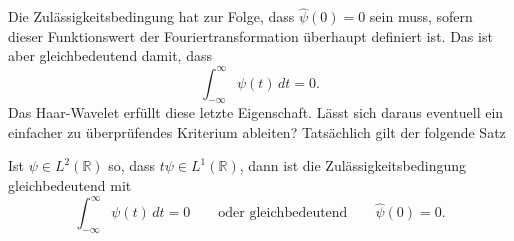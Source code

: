 Die Zulässigkeitsbedingung hat zur Folge, dass $\hat{\psi}(0)=0$ sein muss,
sofern dieser Funktionswert der Fouriertransformation überhaupt
definiert ist.
Das ist aber gleichbedeutend damit, dass 
\[
\int_{-\infty}^\infty \psi(t)\,dt = 0.
\]
Das Haar-Wavelet erfüllt diese letzte Eigenschaft.
Lässt sich daraus eventuell ein einfacher zu überprüfendes Kriterium
ableiten?
Tatsächlich gilt der folgende Satz

\begin{satz}
\label{satz:zulaessigkeit}
Ist $\psi \in L^2(\mathbb R)$ so, dass $t\psi\in L^1(\mathbb R)$, dann
ist die Zulässigkeitsbedingung gleichbedeutend mit
\begin{equation}
\int_{-\infty}^\infty \psi(t)\,dt = 0
\qquad\text{oder gleichbedeutend}\qquad
\hat{\psi}(0)=0.
\label{gleichbedeutend}
\end{equation}
\end{satz}

